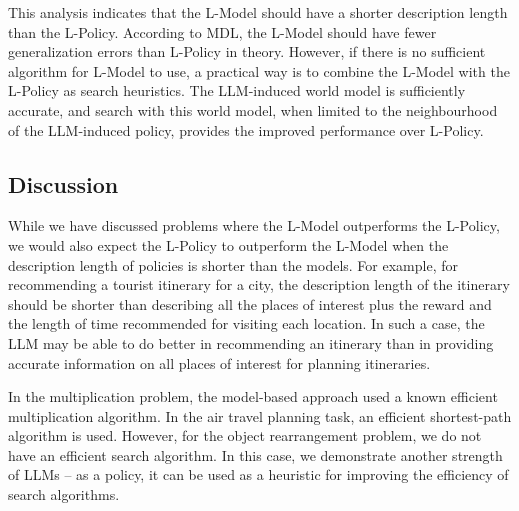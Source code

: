 This analysis indicates that the L-Model should have a shorter description length than the L-Policy. According to MDL, the L-Model should have fewer generalization errors than L-Policy in theory. However, if there is no sufficient algorithm for L-Model to use, a practical way is to combine the L-Model with the L-Policy as search heuristics. The LLM-induced world model is sufficiently accurate, and search with this world model, when limited to the neighbourhood of the LLM-induced policy, provides the improved performance over L-Policy. 

\subsection{Discussion}
{
While we have discussed problems where the L-Model outperforms the L-Policy, we would also expect the L-Policy to outperform the L-Model when the description length of policies is shorter than the models. For example, for recommending a tourist itinerary for a city, the description length of the itinerary should be shorter than describing all the places of interest plus the reward and the length of time recommended for visiting each location. In such a case, the LLM may be able to do better in recommending an itinerary than in providing accurate information on all places of interest for planning itineraries.

In the multiplication problem, the model-based approach used a known efficient multiplication algorithm. In the air travel planning task, an efficient shortest-path algorithm is used. However, for the object rearrangement problem, we do not have an efficient search algorithm. In this case, we demonstrate another strength of LLMs -- as a policy, it can be used as a heuristic for improving the efficiency of search algorithms. 


}


